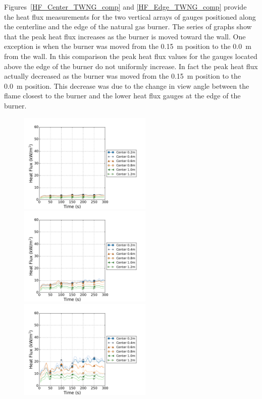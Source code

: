 \documentclass[twoside]{uocthesis}
\begin{document}
{Figures~\ref{HF_Center_TWNG_comp} and \ref{HF_Edge_TWNG_comp} provide the heat flux measurements for the two vertical arrays of gauges positioned along the centerline and the edge of the natural gas burner.  The series of graphs show that the peak heat flux increases as the burner is moved toward the wall. One exception is when the burner was moved from the 0.15~m position to the 0.0~m from the wall. In this comparison the peak heat flux values for the gauges located above the edge of the burner do not uniformly increase.  In fact the peak heat flux actually decreased as the burner was moved from the 0.15~m position to the 0.0~m position. This decrease was due to the change in view angle between the flame closest to the burner and the lower heat flux gauges at the edge of the burner.

\begin{figure}[ht!]
	\centering
	\includegraphics[width=2.5in]{../Figures/TWNG01_HF_Center_Avg}
	\includegraphics[width=2.5in]{../Figures/TWNG03_HF_Center_Avg}\\
	\includegraphics[width=2.5in]{../Figures/TWNG05_HF_Center_Avg}

\end{figure}}
\end{document}
